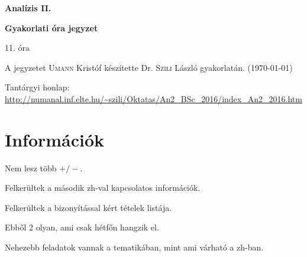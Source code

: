 \documentclass[a4paper,11.5pt]{article}
\begin{document}
	\setlength\parindent{0pt}
	\def\s{\hspace{0.2mm}\vphantom{\beta}}
	\def\Z{\mathbb{Z}}
	\def\Q{\mathbb{Q}}
	\def\R{\mathbb{R}}
	\def\C{\mathbb{C}}
	\def\N{\mathbb{N}}
	\def\Rn{\mathbb{R}^{n}}
	\def\Ra{\overline{\mathbb{R}}}
	\def\sume{\displaystyle\sum_{n=1}^{+\infty}}
	\def\sumn{\displaystyle\sum_{n=0}^{+\infty}}
	\def\biz{\emph{Bizonyítás:\ }}
	\def\narrow{\underset{n\rightarrow+\infty}{\longrightarrow}}
	\def\limn{\displaystyle\lim_{n\to +\infty}}
	\def\limx{\displaystyle\lim_{x\to +\infty}}
	
	\theoremstyle{definition}
	\newtheorem{theorem}{Tétel}[subsection] %
	
	\theoremstyle{definition}
	\newtheorem{definition}[theorem]{Definíció} %
	\newtheorem{example}[theorem]{Példa} %
	\newtheorem{task}[theorem]{Feladat} %
	\newtheorem{note}[theorem]{Megjegyzés} %
	\newtheorem{revision}[theorem]{Emlékeztető} %
	\begin{center}
		{\LARGE \textbf{Analízis II.}}
		
		{\large \textbf{Gyakorlati óra jegyzet}}
		
		11. óra
	\end{center}
	A jegyzetet \textsc{Umann} Kristóf készítette Dr. \textsc{Szili} László gyakorlatán. (\today)
	
	Tantárgyi honlap: \url{http://numanal.inf.elte.hu/~szili/Oktatas/An2_BSc_2016/index_An2_2016.htm}
	\section{Információk}
	\begin{compactitem}
		\item Nem lesz több $+/-$.
		\item Felkerültek a második zh-val kapcsolatos információk.
		\item Felkerültek a bizonyítással kért tételek listája.
		\item Ebből 2 olyan, ami csak hétfőn hangzik el.
		\item Nehezebb feladatok vannak a tematikában, mint ami várható a zh-ban.
	\end{compactitem}
\end{document}
